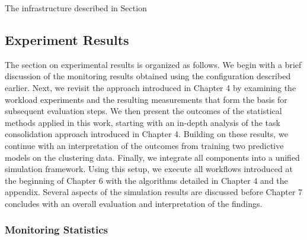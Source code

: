 The infrastructure described in Section %

% 

\subsection{Experiment Results}
\label{sec:experiment_results}
The section on experimental results is organized as follows. We begin with a brief discussion of the monitoring results obtained using the configuration described earlier. Next, we revisit the approach introduced in Chapter 4 by examining the workload experiments and the resulting measurements that form the basis for subsequent evaluation steps. We then present the outcomes of the statistical methods applied in this work, starting with an in-depth analysis of the task consolidation approach introduced in Chapter 4. Building on these results, we continue with an interpretation of the outcomes from training two predictive models on the clustering data. Finally, we integrate all components into a unified simulation framework. Using this setup, we execute all workflows introduced at the beginning of Chapter 6 with the algorithms detailed in Chapter 4 and the appendix. Several aspects of the simulation results are discussed before Chapter 7 concludes with an overall evaluation and interpretation of the findings.
\subsubsection{Monitoring Statistics}
\label{sec:monitoring_statistics}

